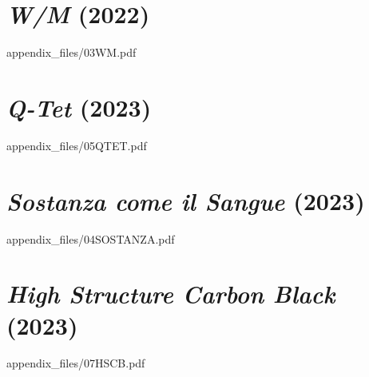 
\chapter{\textit{W/M} (2022)}

        
            {appendix_files/03WM.pdf}
    

\chapter{\textit{Q-Tet} (2023)}

        
            {appendix_files/05QTET.pdf}
    

\chapter{\textit{Sostanza come il Sangue} (2023)}
    
        
            {appendix_files/04SOSTANZA.pdf}
    

\chapter{\textit{High Structure Carbon Black} (2023)}

        
            {appendix_files/07HSCB.pdf}
    

